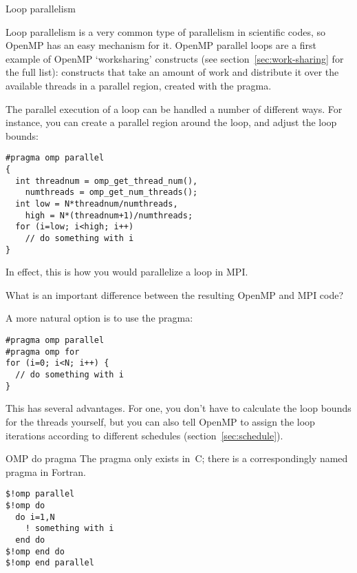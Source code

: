 
 {Loop parallelism}
\label{sec:omp-for}

Loop parallelism is a very common type of parallelism in scientific
codes, so OpenMP has an easy mechanism for it.
OpenMP parallel loops are a first example of OpenMP `worksharing'
constructs (see section~\ref{sec:work-sharing} for the full list):
constructs that take an amount of work and distribute it over the
available threads in a parallel region,
created with the  pragma.

The parallel execution of a loop can be handled a number of different ways.
For instance, you can create a parallel region around the loop, and
adjust the loop bounds:
\begin{lstlisting}
#pragma omp parallel
{
  int threadnum = omp_get_thread_num(),
    numthreads = omp_get_num_threads();
  int low = N*threadnum/numthreads,
    high = N*(threadnum+1)/numthreads;
  for (i=low; i<high; i++)
    // do something with i
}
\end{lstlisting}
In effect, this is how you would parallelize a loop in MPI.
\begin{exercise}
  What is an important difference between the resulting OpenMP and MPI code?
\end{exercise}

A more natural option is to use the
 pragma:
\begin{lstlisting}
#pragma omp parallel
#pragma omp for
for (i=0; i<N; i++) {
  // do something with i
}
\end{lstlisting}
This has several advantages. For one, you don't have to calculate the loop bounds
for the threads yourself, but you can also tell OpenMP to assign the loop
iterations according to different schedules (section~\ref{sec:schedule}).

\begin{fortrannote}{OMP do pragma}
  The  pragma only exists in~C;
  there is a correspondingly named  pragma in Fortran.
\begin{lstlisting}
$!omp parallel
$!omp do
  do i=1,N
    ! something with i
  end do
$!omp end do
$!omp end parallel
\end{lstlisting}
\end{fortrannote}

